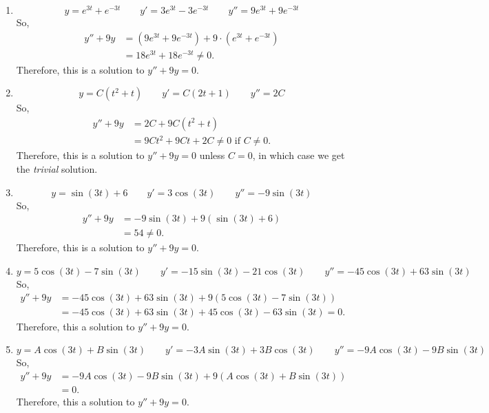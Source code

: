 \documentclass[]{ximera}
\begin{document}
	\begin{freeResponse}
	\begin{enumerate}
	
	\item  \[ y = e^{3t}+e^{-3t} 	\qquad	y'=3e^{3t}-3e^{-3t} 	\qquad	y''=9e^{3t}+9e^{-3t} \]  
	So,
		\begin{align*}
		y''+9y &= (9e^{3t}+9e^{-3t}) + 9\cdot (e^{3t}+e^{-3t})  \\
		&= 18e^{3t} + 18e^{-3t} \neq 0.
		\end{align*}
	Therefore, this is  a solution to $y''+9y=0$.
	
	
	
	\item  \[ y = C(t^2+t) 	\qquad	y'=C(2t+1) 	\qquad	y''=2C \] 
	So,
		\begin{align*}
		y''+9y &= 2C + 9C(t^2+t)  \\
		&= 9Ct^2 + 9Ct + 2C \neq 0 \text{ if } C \neq 0.
		\end{align*}
	Therefore, this is  a solution to $y''+9y=0$ unless $C=0$, in which case we get the {\it trivial} solution.
	
	
	
	\item  \[ y = \sin(3t)+6 	\qquad	y'=3\cos(3t) 	\qquad	y''=-9\sin(3t) \]  
	So,
		\begin{align*}
		y''+9y 
		&= -9\sin(3t) +9(\sin(3t) + 6)  \\
		&= 54 \neq 0.
		\end{align*}
	Therefore, this is  a solution to $y''+9y=0$.
	
	
	
	\item  \[ y = 5\cos(3t)-7\sin(3t) 	\qquad	y'=-15\sin(3t)-21\cos(3t) 	\qquad	y''=-45\cos(3t)+63\sin(3t) \]  
	So,
		\begin{align*}
		y''+9y 
		&= -45\cos(3t)+63\sin(3t) +9(5\cos(3t)-7\sin(3t))  \\
		&= -45\cos(3t)+63\sin(3t) + 45\cos(3t) - 63\sin(3t) = 0.
		\end{align*}
	Therefore, this  a solution to $y''+9y=0$.
	
	
	
	\item  \[ y = A\cos(3t)+B\sin(3t) 	\qquad	y'=-3A\sin(3t)+3B\cos(3t) 	\qquad	y''=-9A\cos(3t)-9B\sin(3t) \]  
	So,
		\begin{align*}
		y''+9y 
		&= -9A\cos(3t)-9B\sin(3t) +9(A\cos(3t)+B\sin(3t))  \\
		&= 0.
		\end{align*}
	Therefore, this  a solution to $y''+9y=0$.
	
	\end{enumerate}
	\end{freeResponse}
	
\end{document}
